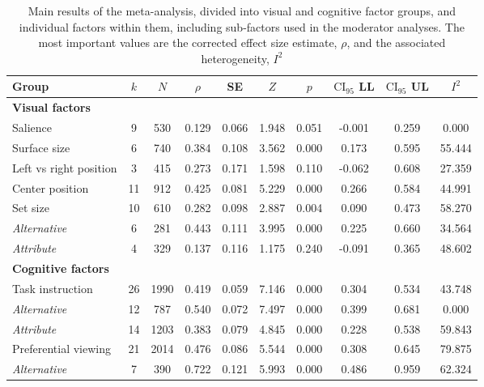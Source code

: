 \begin{table}[ht]
\centering
\caption{Main results of the meta-analysis, divided into visual and cognitive factor groups, and individual factors within them, including sub-factors used in the moderator analyses. The most important values are the corrected effect size estimate, $\rho$, and the associated heterogeneity, $I^2$} 
\label{tab:main_results}
\begin{tabular}{lccccccccc}
  \hline
Group & $k$ & $N$ & $\rho$ & SE & $Z$ & $p$ & $\textrm{CI}_{95}$ LL & $\textrm{CI}_{95}$ UL & $I^2$ \\ 
  \hline
\textbf{Visual factors} &  &  &  &  &  &  &  &  &  \\ 
  Salience & 9 & 530 & 0.129 & 0.066 & 1.948 & 0.051 & -0.001 & 0.259 & 0.000 \\ 
  Surface size & 6 & 740 & 0.384 & 0.108 & 3.562 & 0.000 & 0.173 & 0.595 & 55.444 \\ 
  Left vs right position & 3 & 415 & 0.273 & 0.171 & 1.598 & 0.110 & -0.062 & 0.608 & 27.359 \\ 
  Center position & 11 & 912 & 0.425 & 0.081 & 5.229 & 0.000 & 0.266 & 0.584 & 44.991 \\ 
  Set size & 10 & 610 & 0.282 & 0.098 & 2.887 & 0.004 & 0.090 & 0.473 & 58.270 \\ 
  \hspace{2mm}\textit{Alternative} & 6 & 281 & 0.443 & 0.111 & 3.995 & 0.000 & 0.225 & 0.660 & 34.564 \\ 
  \hspace{2mm}\textit{Attribute} & 4 & 329 & 0.137 & 0.116 & 1.175 & 0.240 & -0.091 & 0.365 & 48.602 \\ 
  \textbf{Cognitive factors} &  &  &  &  &  &  &  &  &  \\ 
  Task instruction & 26 & 1990 & 0.419 & 0.059 & 7.146 & 0.000 & 0.304 & 0.534 & 43.748 \\ 
  \hspace{2mm}\textit{Alternative} & 12 & 787 & 0.540 & 0.072 & 7.497 & 0.000 & 0.399 & 0.681 & 0.000 \\ 
  \hspace{2mm}\textit{Attribute} & 14 & 1203 & 0.383 & 0.079 & 4.845 & 0.000 & 0.228 & 0.538 & 59.843 \\ 
  Preferential viewing & 21 & 2014 & 0.476 & 0.086 & 5.544 & 0.000 & 0.308 & 0.645 & 79.875 \\ 
  \hspace{2mm}\textit{Alternative} & 7 & 390 & 0.722 & 0.121 & 5.993 & 0.000 & 0.486 & 0.959 & 62.324 \\ 

\end{tabular}
\end{table}
